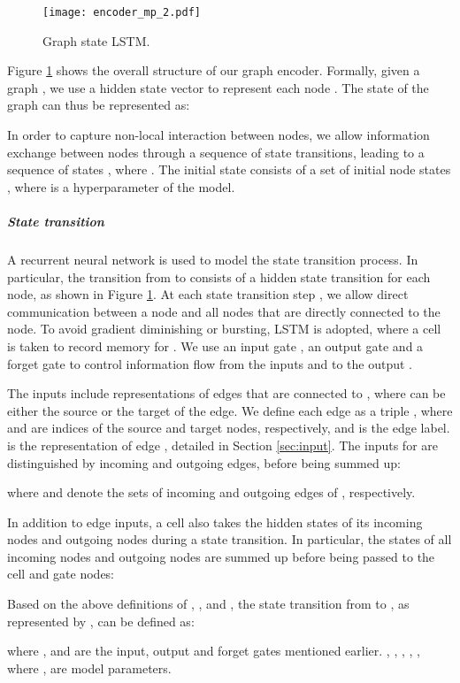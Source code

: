 \documentclass[11pt,a4paper]{article}
\begin{document}
\begin{figure}
\centering
\texttt{[image: encoder\_mp\_2.pdf]}
\caption{Graph state LSTM.}
\label{fig:encoder}
\end{figure}


Figure \ref{fig:encoder} shows the overall structure of our graph encoder. 
Formally, given a graph , we use a hidden state vector  to represent each node . 
The state of the graph can thus be represented as:

In order to capture non-local interaction between nodes, we allow information exchange between nodes through a sequence of state transitions, leading to a sequence of states , where .
The initial state  consists of a set of initial node states , where  is a hyperparameter of the model. 


\subparagraph{State transition}
A recurrent neural network is used to model the state transition process. 
In particular, the transition from  to  consists of a
hidden state transition for each node, as shown in Figure \ref{fig:encoder}. 
At each state transition step , we allow direct communication between a node and all nodes that are directly connected to the node. 
To avoid gradient diminishing or bursting, LSTM \cite{hochreiter1997long} is adopted, where a cell  is taken to record memory for . 
We use an input gate , an output gate  and a forget gate  to control information flow from the inputs and to the output .


The inputs include representations of edges that are connected to , where  can be either the source or the target of the edge.
We define each edge as a triple , where  and  are indices of the source and target nodes, respectively, and  is the edge label.
 is the representation of edge , detailed in Section \ref{sec:input}.
The inputs for  are distinguished by incoming and outgoing edges, before being summed up:

where  and  denote the sets of incoming and outgoing edges of , respectively.

In addition to edge inputs, a cell also takes the hidden states of its incoming nodes and outgoing nodes during a state transition. 
In particular, the states of all incoming nodes and outgoing nodes are summed up before being passed to the cell and gate nodes:
 
Based on the above definitions of , ,  and , the state transition from  to , as represented by , can be defined as:

where ,  and  are the input, output and forget gates mentioned earlier. , , , , , where , are model parameters. 
\end{document}

